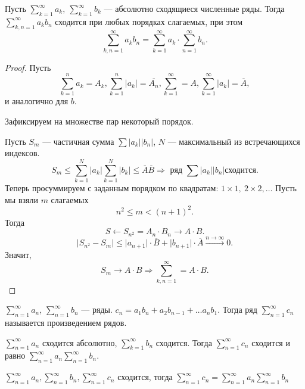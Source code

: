 \begin{thm}
    Пусть $ \sum_{k=1}^{\infty} a_k, ~ \sum_{k=1}^{\infty}b_k $ --- абсолютно сходящиеся численные ряды.
	Тогда $ \sum_{k, n =1}^{\infty}a_k b_n $ сходится при любых порядках слагаемых,
	при этом 
	$$ \sum_{k,n=1}^{\infty} a_k b_n = \sum_{k=1}^{\infty} a_k \cdot \sum_{n=1}^{\infty}b_n .$$
\end{thm}
\begin{proof}
    Пусть 
	$$ \sum_{k=1}^{n} a_k = A_k, \sum_{k=1}^{n} \lvert a_k \rvert = \overline{A_n}, \sum_{k=1}^{\infty}  =A, \sum_{k=1}^{\infty} \lvert a_k \rvert = \overline{A} ,$$ и аналогично для $ b$.
    
    Зафиксируем на множестве пар некоторый порядок.

	Пусть
    $ S_m$ --- частичная сумма $ \sum \lvert a_k \rvert \lvert b_n \rvert $, $ N $ --- максимальный из встречающихся индексов.
    \[
	S_m \le \sum_{k=1}^{N}  \lvert a_k \rvert \sum_{k=1}^{N}  \lvert b_k \rvert \le \overline{A} \overline{B} \Longrightarrow \text{ ряд } \sum \lvert a_k \rvert \lvert b_n \rvert  \text{сходится}
    .\] 
    Теперь просуммируем с заданным порядком по квадратам: $ 1\times 1, ~ 2\times 2, \ldots $
	Пусть мы взяли $ m$ слагаемых
    \[
	n^2 \le m <(n+1)^2
    .\] 
	Тогда
    \[
    S \leftarrow S_{n^2} = A_n\cdot  B_n \to  A\cdot B
    .\] 
    \[
	\lvert S_{n^2} - S_m \rvert \le \lvert a_{n+1} \rvert \cdot \overline{B} 
	+ \lvert b_{n+1} \rvert 
	\cdot \overline{A}
	\stackrel{n \to  \infty}{\longrightarrow} 0
    .\] 
	Значит,
	\[
	S_m \to  A\cdot B \Longrightarrow \sum_{k, n = 1}^{\infty} = A \cdot B
	.\] 
\end{proof}

\begin{defn}
    $ \sum_{n=1}^{\infty} a_n$, $ \sum_{n=1}^{\infty} b_n$ --- ряды. 
	$ c_n = a_1b_n + a_2b_{n-1} + \ldots a_nb_1$.
	Тогда ряд $ \sum_{n=1}^{\infty} c_n$ называется {\sf  произведением рядов}.  
\end{defn}

\begin{thm}[Мергенс]
    $ \sum_{n=1}^{\infty} a_n$ сходится абсолютно, $ \sum_{k=1}^{\infty} b_n$ сходится. Тогда $ \sum_{n=1}^{\infty} c_n $ сходится и равно $ \sum_{n=1}^{\infty} a_n \sum_{n=1}^{\infty} b_n$.
\end{thm}

\begin{thm}[Абель]
    $ \sum_{n=1}^{\infty} a_n, \sum_{n=1}^{\infty} b_n, \sum_{n=1}^{\infty} c_n$ сходится, тогда $ \sum_{n=1}^{\infty} c_n = \sum_{n=1}^{\infty} a_n \sum_{n=1}^{\infty} b_n$
\end{thm}

